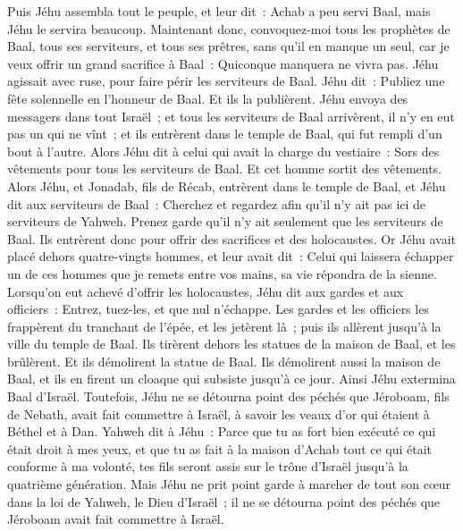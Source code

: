 \begin{multicols}{2}
Puis Jéhu assembla tout le peuple, et leur dit~: Achab a peu servi Baal, mais Jéhu le servira beaucoup.
Maintenant donc, convoquez-moi tous les prophètes de Baal, tous ses serviteurs, et tous ses prêtres, sans qu'il en manque un seul, car je veux offrir un grand sacrifice à Baal~: Quiconque manquera ne vivra pas. Jéhu agissait avec ruse, pour faire périr les serviteurs de Baal.
Jéhu dit~: Publiez une fête solennelle en l'honneur de Baal. Et ils la publièrent.
Jéhu envoya des messagers dans tout Israël~; et tous les serviteurs de Baal arrivèrent, il n'y en eut pas un qui ne vînt~; et ils entrèrent dans le temple de Baal, qui fut rempli d'un bout à l'autre.
Alors Jéhu dit à celui qui avait la charge du vestiaire~: Sors des vêtements pour tous les serviteurs de Baal. Et cet homme sortit des vêtements.
Alors Jéhu, et Jonadab, fils de Récab, entrèrent dans le temple de Baal, et Jéhu dit aux serviteurs de Baal~: Cherchez et regardez afin qu'il n'y ait pas ici de serviteurs de Yahweh. Prenez garde qu'il n'y ait seulement que les serviteurs de Baal.
Ils entrèrent donc pour offrir des sacrifices et des holocaustes. Or Jéhu avait placé dehors quatre-vingts hommes, et leur avait dit~: Celui qui laissera échapper un de ces hommes que je remets entre vos mains, sa vie répondra de la sienne.
Lorsqu'on eut achevé d'offrir les holocaustes, Jéhu dit aux gardes et aux officiers~: Entrez, tuez-les, et que nul n'échappe. Les gardes et les officiers les frappèrent du tranchant de l'épée, et les jetèrent là~; puis ils allèrent jusqu'à la ville du temple de Baal.
Ils tirèrent dehors les statues de la maison de Baal, et les brûlèrent.
Et ils démolirent la statue de Baal. Ils démolirent aussi la maison de Baal, et ils en firent un cloaque qui subsiste jusqu'à ce jour.
Ainsi Jéhu extermina Baal d'Israël.
Toutefois, Jéhu ne se détourna point des péchés que Jéroboam, fils de Nebath, avait fait commettre à Israël, à savoir les veaux d'or qui étaient à Béthel et à Dan.
Yahweh dit à Jéhu~: Parce que tu as fort bien exécuté ce qui était droit à mes yeux, et que tu as fait à la maison d'Achab tout ce qui était conforme à ma volonté, tes fils seront assis sur le trône d'Israël jusqu'à la quatrième génération.
Mais Jéhu ne prit point garde à marcher de tout son cœur dans la loi de Yahweh, le Dieu d'Israël~; il ne se détourna point des péchés que Jéroboam avait fait commettre à Israël.

\end{multicols}

